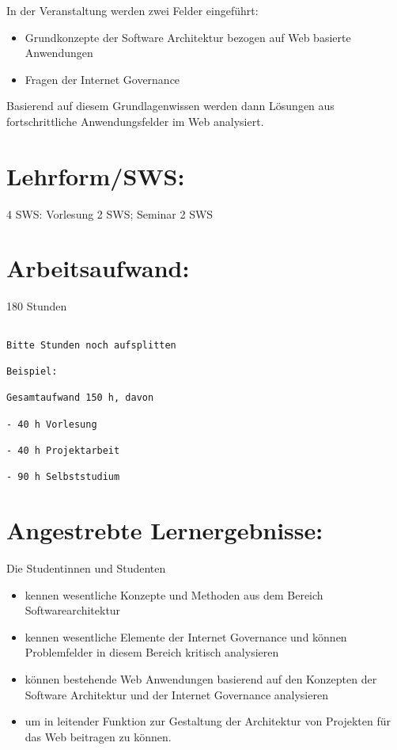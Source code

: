 In der Veranstaltung werden zwei Felder eingeführt:

\begin{itemize}
\tightlist
\item
  Grundkonzepte der Software Architektur bezogen auf Web basierte
  Anwendungen
\item
  Fragen der Internet Governance
\end{itemize}

Basierend auf diesem Grundlagenwissen werden dann Lösungen aus
fortschrittliche Anwendungsfelder im Web analysiert.

\section*{Lehrform/SWS:}\label{lehrformsws-22}

4 SWS: Vorlesung 2 SWS; Seminar 2 SWS

\section*{Arbeitsaufwand:}\label{arbeitsaufwand-28}

180 Stunden

\begin{verbatim}

Bitte Stunden noch aufsplitten

Beispiel:

Gesamtaufwand 150 h, davon 

- 40 h Vorlesung 

- 40 h Projektarbeit  

- 90 h Selbststudium 
\end{verbatim}

\section*{Angestrebte
Lernergebnisse:}\label{angestrebte-lernergebnisse-22}

Die Studentinnen und Studenten

\begin{itemize}
\tightlist
\item
  kennen wesentliche Konzepte und Methoden aus dem Bereich
  Softwarearchitektur
\item
  kennen wesentliche Elemente der Internet Governance und können
  Problemfelder in diesem Bereich kritisch analysieren
\item
  können bestehende Web Anwendungen basierend auf den Konzepten der
  Software Architektur und der Internet Governance analysieren
\item
  um in leitender Funktion zur Gestaltung der Architektur von Projekten
  für das Web beitragen zu können.
\end{itemize}

